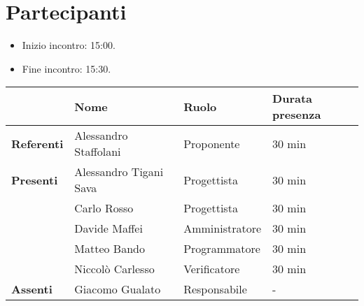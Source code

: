\section*{Partecipanti}

\begin{itemize}
	\item Inizio incontro: 15:00.
	\item Fine incontro: 15:30.
\end{itemize}


\begin{center}
	{\renewcommand{\arraystretch}{1.5}
		\begin{tabular}{l|lll}
			                   & \textbf{Nome}          & \textbf{Ruolo}  & \textbf{Durata presenza} \\
			\hline
			\textbf{Referenti} & Alessandro Staffolani  & Proponente		& 30 min                   \\
			\hline
			\textbf{Presenti}  & Alessandro Tigani Sava & Progettista		& 30 min                   \\
			                   & Carlo Rosso            & Progettista		& 30 min                   \\
			                   & Davide Maffei          & Amministratore	& 30 min                   \\
			                   & Matteo Bando           & Programmatore		& 30 min                   \\
			                   & Niccolò Carlesso       & Verificatore		& 30 min                   \\
			\hline
			\textbf{Assenti}   & Giacomo Gualato        & Responsabile		& -                        \\
		\end{tabular}
	}
\end{center}
